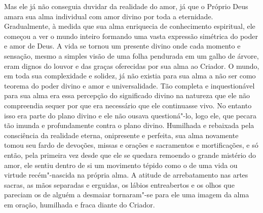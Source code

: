 Mas ele já não conseguia duvidar da realidade do amor, já que o Próprio
Deus amara sua alma individual com amor divino por toda a eternidade.
Gradualmente, à medida que sua alma enriquecia de conhecimento
espiritual, ele começou a ver o mundo inteiro formando uma vasta
expressão simétrica do poder e amor de Deus. A vida se tornou um
presente divino onde cada momento e sensação, mesmo a simples visão de
uma folha pendurada em um galho de árvore, eram dignos do louvor e das
graças oferecidas por sua alma ao Criador. O mundo, em toda sua
complexidade e solidez, já não existia para sua alma a não ser como
teorema do poder divino e amor e universalidade. Tão completa e
inquestionável para sua alma era essa percepção do significado divino
na natureza que ele não compreendia sequer por que era necessário que
ele continuasse vivo. No entanto isso era parte do plano divino e ele
não ousava questioná"-lo, logo ele, que pecara tão imunda e
profundamente contra o plano divino. Humilhada e rebaixada pela
consciência da realidade eterna, onipresente e perfeita, sua alma
novamente tomou seu fardo de devoções, missas e orações e sacramentos e
mortificações, e só então, pela primeira vez desde que ele se quedara
remoendo o grande mistério do amor, ele sentiu dentro de si um
movimento tépido como o de uma vida ou virtude recém"-nascida na própria
alma. A atitude de arrebatamento nas artes sacras, as mãos separadas e
erguidas, os lábios entreabertos e os olhos que pareciam os de alguém a
desmaiar tornaram"-se para ele uma imagem da alma em oração, humilhada e
fraca diante do  Criador.

